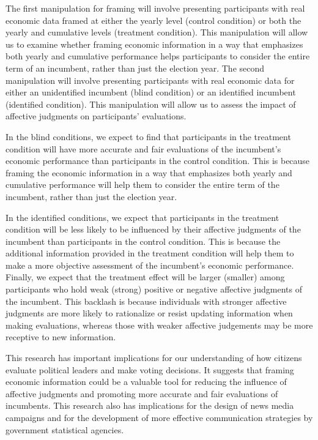 \documentclass[
]{article}
\begin{document}
The first manipulation for framing will involve presenting participants
with real economic data framed at either the yearly level (control
condition) or both the yearly and cumulative levels (treatment
condition). This manipulation will allow us to examine whether framing
economic information in a way that emphasizes both yearly and cumulative
performance helps participants to consider the entire term of an
incumbent, rather than just the election year. The second manipulation
will involve presenting participants with real economic data for either
an unidentified incumbent (blind condition) or an identified incumbent
(identified condition). This manipulation will allow us to assess the
impact of affective judgments on participants' evaluations.

In the blind conditions, we expect to find that participants in the
treatment condition will have more accurate and fair evaluations of the
incumbent's economic performance than participants in the control
condition. This is because framing the economic information in a way
that emphasizes both yearly and cumulative performance will help them to
consider the entire term of the incumbent, rather than just the election
year.

In the identified conditions, we expect that participants in the
treatment condition will be less likely to be influenced by their
affective judgments of the incumbent than participants in the control
condition. This is because the additional information provided in the
treatment condition will help them to make a more objective assessment
of the incumbent's economic performance. Finally, we expect that the
treatment effect will be larger (smaller) among participants who hold
weak (strong) positive or negative affective judgments of the incumbent.
This backlash is because individuals with stronger affective judgments
are more likely to rationalize or resist updating information when
making evaluations, whereas those with weaker affective judgements may
be more receptive to new information.

This research has important implications for our understanding of how
citizens evaluate political leaders and make voting decisions. It
suggests that framing economic information could be a valuable tool for
reducing the influence of affective judgments and promoting more
accurate and fair evaluations of incumbents. This research also has
implications for the design of news media campaigns and for the
development of more effective communication strategies by government
statistical agencies.
\end{document}
